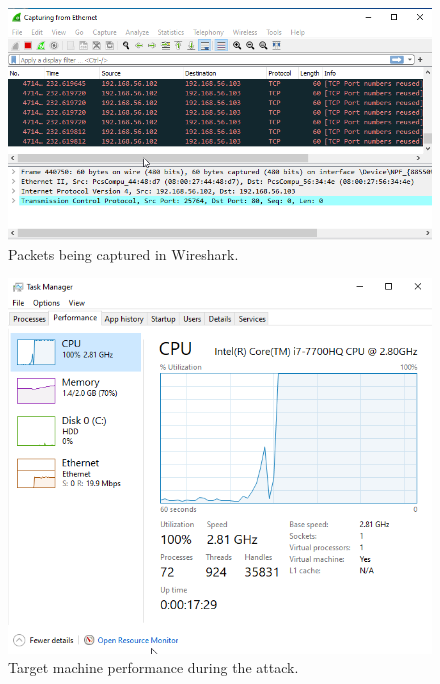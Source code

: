 \begin{figure}[H]
    \centering
    \includegraphics[width=\linewidth]{figures/target_packets.png}
    \caption{Packets being captured in Wireshark.}
    \label{fig:packets}
\end{figure}

\begin{figure}[H]
    \centering
    \includegraphics[width=\linewidth]{figures/during_performance.png}
    \caption{Target machine performance during the attack.}
    \label{fig:performance-during}
\end{figure}

